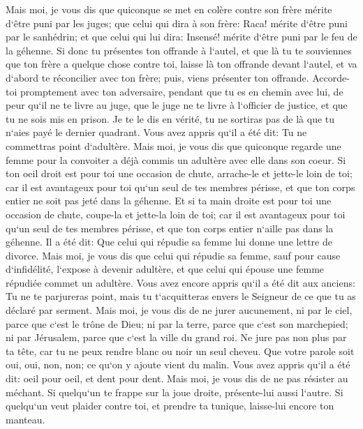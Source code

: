 \verse Mais moi, je vous dis que quiconque se met en colère contre son frère mérite d`être puni par les juges; que celui qui dira à son frère: Raca! mérite d`être puni par le sanhédrin; et que celui qui lui dira: Insensé! mérite d`être puni par le feu de la géhenne. 
\verse Si donc tu présentes ton offrande à l`autel, et que là tu te souviennes que ton frère a quelque chose contre toi, 
\verse laisse là ton offrande devant l`autel, et va d`abord te réconcilier avec ton frère; puis, viens présenter ton offrande. 
\verse Accorde-toi promptement avec ton adversaire, pendant que tu es en chemin avec lui, de peur qu`il ne te livre au juge, que le juge ne te livre à l`officier de justice, et que tu ne sois mis en prison. 
\verse Je te le dis en vérité, tu ne sortiras pas de là que tu n`aies payé le dernier quadrant. 
\verse Vous avez appris qu`il a été dit: Tu ne commettras point d`adultère. 
\verse Mais moi, je vous dis que quiconque regarde une femme pour la convoiter a déjà commis un adultère avec elle dans son coeur. 
\verse Si ton oeil droit est pour toi une occasion de chute, arrache-le et jette-le loin de toi; car il est avantageux pour toi qu`un seul de tes membres périsse, et que ton corps entier ne soit pas jeté dans la géhenne. 
\verse Et si ta main droite est pour toi une occasion de chute, coupe-la et jette-la loin de toi; car il est avantageux pour toi qu`un seul de tes membres périsse, et que ton corps entier n`aille pas dans la géhenne. 
\verse Il a été dit: Que celui qui répudie sa femme lui donne une lettre de divorce. 
\verse Mais moi, je vous dis que celui qui répudie sa femme, sauf pour cause d`infidélité, l`expose à devenir adultère, et que celui qui épouse une femme répudiée commet un adultère. 
\verse Vous avez encore appris qu`il a été dit aux anciens: Tu ne te parjureras point, mais tu t`acquitteras envers le Seigneur de ce que tu as déclaré par serment. 
\verse Mais moi, je vous dis de ne jurer aucunement, ni par le ciel, parce que c`est le trône de Dieu; 
\verse ni par la terre, parce que c`est son marchepied; ni par Jérusalem, parce que c`est la ville du grand roi. 
\verse Ne jure pas non plus par ta tête, car tu ne peux rendre blanc ou noir un seul cheveu. 
\verse Que votre parole soit oui, oui, non, non; ce qu`on y ajoute vient du malin. 
\verse Vous avez appris qu`il a été dit: oeil pour oeil, et dent pour dent. 
\verse Mais moi, je vous dis de ne pas résister au méchant. Si quelqu`un te frappe sur la joue droite, présente-lui aussi l`autre. 
\verse Si quelqu`un veut plaider contre toi, et prendre ta tunique, laisse-lui encore ton manteau. 
